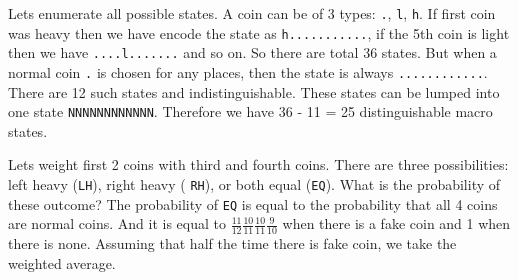 \documentclass[answers]{exam}
\begin{document}
\begin{questions}
\begin{solution}

Lets enumerate all possible states. A coin can be of 3 types: \texttt{.},
\texttt{l}, \texttt{h}. If first coin was heavy then we have encode the state as
\texttt{h...........}, if the 5th coin is light then we have
\texttt{....l.......} and so on. So there are total 36 states. But when a normal
coin \texttt{.} is chosen for any places, then the state is always
\texttt{............}. There are 12 such states and indistinguishable. These
states can be lumped into one state \texttt{NNNNNNNNNNNN}. Therefore we have 36
- 11 = 25 distinguishable macro states.

Lets weight first 2 coins with third and fourth coins.  There are three
possibilities: left heavy (\texttt{LH}), right heavy ( \texttt{RH}), or both
equal (\texttt{EQ}). What is the probability of these outcome? The probability
of \texttt{EQ} is equal to the probability that all 4 coins are normal coins.
And it is equal to $\frac{11}{12}\frac{10}{11}\frac{10}{11}\frac{9}{10}$ when
there is a fake coin and 1 when there is none. Assuming that half the time there
is fake coin, we take the weighted average.

\end{solution}

\end{questions}
\end{document}
